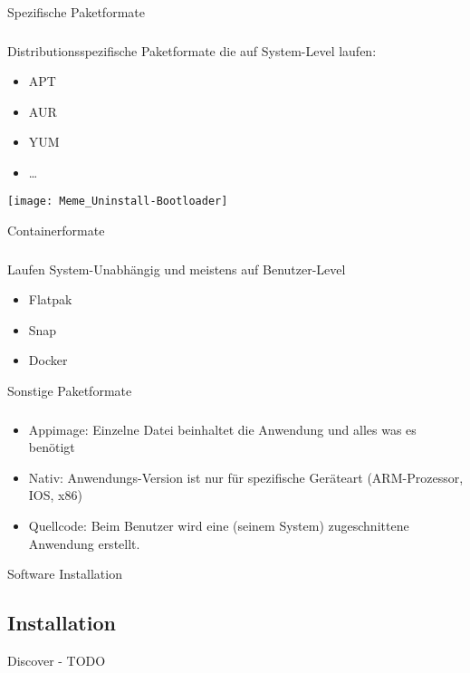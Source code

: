 \begin{frame}{Spezifische Paketformate}
    \subsubsection{}\label{subsubsec:spezifische-formate}

        Distributionsspezifische Paketformate die auf System-Level laufen:
        \begin{itemize}
            \item APT
            \item AUR
            \item YUM
            \item \ldots
        \end{itemize}
    \endminipage\hfill
        \texttt{[image: Meme\_Uninstall-Bootloader]}
    \endminipage\hfill
\end{frame}

\begin{frame}{Containerformate}
    \subsubsection{}\label{subsubsec:containerformate}

    Laufen System-Unabhängig und meistens auf Benutzer-Level

    \begin{itemize}
        \item Flatpak
        \item Snap
        \item Docker
    \end{itemize}

\end{frame}

\begin{frame}{Sonstige Paketformate}
    \subsubsection{}\label{subsubsec:sonstige-paketformate}

    \begin{itemize}
        \item Appimage: Einzelne Datei beinhaltet die Anwendung und alles was es benötigt
        \item Nativ: Anwendungs-Version ist nur für spezifische Geräteart (ARM-Prozessor, IOS, x86)
        \item Quellcode: Beim Benutzer wird eine (seinem System) zugeschnittene Anwendung erstellt.
    \end{itemize}

\end{frame}

\begin{frame}{Software Installation}
    \subsection{Installation}\label{subsec:installation}

    Discover - TODO

\end{frame}